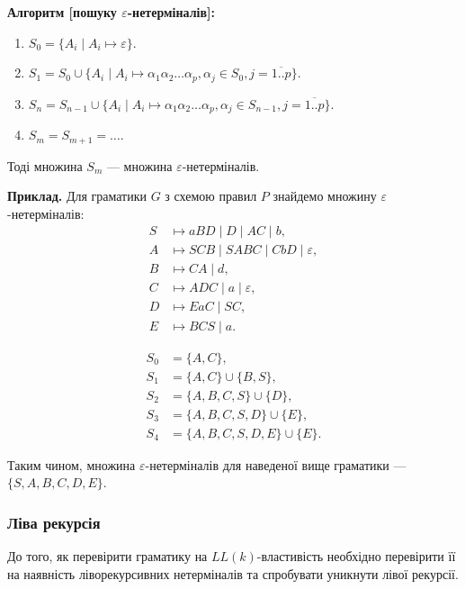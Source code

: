 \textbf{Алгоритм [пошуку $\varepsilon$-нетерміналів]:}
\begin{enumerate}
	\item $S_0 = \{A_i \mid A_i \mapsto \varepsilon \}$.
	\item $S_1 = S_0 \cup \{ A_i \mid A_i \mapsto \alpha_1 \alpha_2 \ldots \alpha_p, \alpha_j \in S_0, j = \overline{1..p} \}$.
	\item $S_n = S_{n-1} \cup \{ A_i \mid A_i \mapsto \alpha_1 \alpha_2 \ldots \alpha_p, \alpha_j \in S_{n-1}, j = \overline{1..p} \}$.
	\item $S_m = S_{m + 1} = \ldots$.
\end{enumerate}

Тоді множина $S_m$ --- множина $\varepsilon$-нетерміналів. \medskip

\textbf{Приклад.} Для граматики $G$ з схемою правил $P$ знайдемо множину $\varepsilon$-нетерміналів: 
\begin{align*}
	S &\mapsto aBD \mid D \mid AC \mid b, \\
	A &\mapsto SCB \mid SABC \mid CbD \mid \varepsilon, \\
	B &\mapsto CA \mid d, \\
	C &\mapsto ADC \mid a \mid \varepsilon, \\
	D &\mapsto EaC \mid SC, \\
	E &\mapsto BCS \mid a.
\end{align*}

\begin{align*}
	S_0 &= \{A, C\}, \\
	S_1 &= \{A, C\} \cup \{B, S\}, \\
	S_2 &= \{A, B, C, S\} \cup \{D\}, \\
	S_3 &= \{A, B, C, S, D\} \cup \{E\}, \\
	S_4 &= \{A, B, C, S, D, E\} \cup \{E\}.
\end{align*}

Таким чином, множина $\varepsilon$-нетерміналів для наведеної вище граматики --- $\{S, A, B, C, D, E\}$.

\subsubsection{Ліва рекурсія}

До того, як перевірити граматику на $LL(k)$-властивість необхідно перевірити її на наявність ліворекурсивних нетерміналів та спробувати уникнути лівої рекурсії. \medskip


